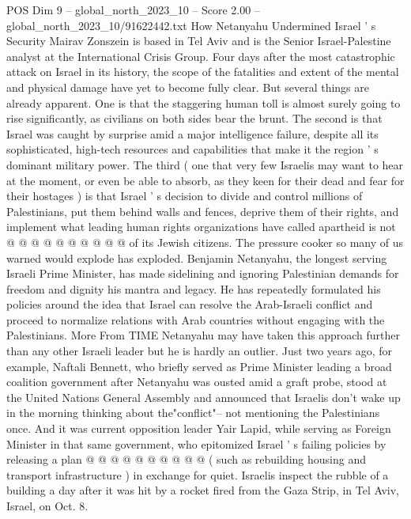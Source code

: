 \begin{textsample}{POS Dim 9 – global\_north\_2023\_10 – Score 2.00 – global\_north\_2023\_10/91622442.txt}  \label{ex:f9_pos_408}
How Netanyahu Undermined Israel ' s Security Mairav Zonszein is based in Tel Aviv and is the Senior Israel-Palestine analyst at the International Crisis Group.
Four days after the most catastrophic attack on Israel in its history, the scope of the fatalities and extent of the mental and physical damage have yet to become fully clear.
But several things are already apparent.
One is that the staggering human toll is almost surely going to rise significantly, as civilians on both sides bear the brunt.
The second is that Israel was caught by surprise amid a major intelligence failure, despite all its sophisticated, high-tech resources and capabilities that make it the region ' s dominant military power.
The third ( one that very few Israelis may want to hear at the moment, or even be able to absorb, as they keen for their dead and fear for their hostages ) is that Israel ' s decision to divide and control millions of Palestinians, put them behind walls and fences, deprive them of their rights, and implement what leading human rights organizations have called apartheid is not @ @ @ @ @ @ @ @ @ @ of its Jewish citizens.
The pressure cooker so many of us warned would explode has exploded.
Benjamin Netanyahu, the longest serving Israeli Prime Minister, has made sidelining and ignoring Palestinian demands for freedom and dignity his mantra and legacy.
He has repeatedly formulated his policies around the idea that Israel can resolve the Arab-Israeli conflict and proceed to normalize relations with Arab countries without engaging with the Palestinians.
More From TIME Netanyahu may have taken this approach further than any other Israeli leader but he is hardly an outlier.
Just two years ago, for example, Naftali Bennett, who briefly served as Prime Minister leading a broad coalition government after Netanyahu was ousted amid a graft probe, stood at the United Nations General Assembly and announced that Israelis don't wake up in the morning thinking about the"conflict"-- not mentioning the Palestinians once.
And it was current opposition leader Yair Lapid, while serving as Foreign Minister in that same government, who epitomized Israel ' s failing policies by releasing a plan @ @ @ @ @ @ @ @ @ @ ( such as rebuilding housing and transport infrastructure ) in exchange for quiet.
Israelis inspect the rubble of a building a day after it was hit by a rocket fired from the Gaza Strip, in Tel Aviv, Israel, on Oct. 8.

\end{textsample}
